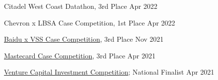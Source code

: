 Citadel West Coast Datathon, 3rd Place \hfill Apr 2022\par
Chevron x LBSA Case Competition, 1st Place \hfill Apr 2022\par
\href{https://www.facebook.com/events/1218686891977031}{Baidu x VSS Case Competition}, 3rd Place \hfill Nov 2021\par
\href{https://www.facebook.com/groups/892224561557976}{Mastecard Case Competition}, 3rd Place \hfill Apr 2021\par
\href{https://www.vcic.org/}{Venture Capital Investment Competition}; National Finalist \hfill Apr 2021\par